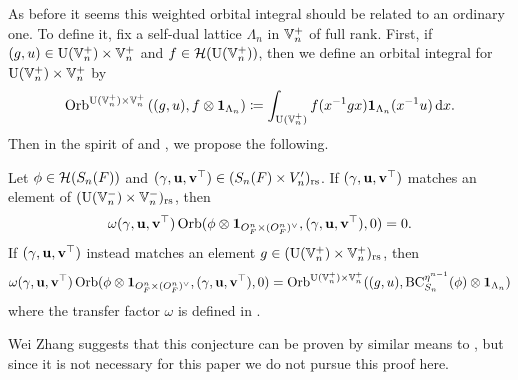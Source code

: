 As before it seems this weighted orbital integral should be related to an ordinary one.
To define it, fix a self-dual lattice $\Lambda_n$ in $\mathbb V_n^+$ of full rank.
First, if $(g,u) \in \operatorname{U}(\mathbb V_n^+) \times \mathbb V_n^+$ and $f \in \mathcal H(\operatorname{U}(\mathbb V_n^+))$,
then we define an orbital integral for $\operatorname{U}(\mathbb V_n^+) \times \mathbb V_n^+$ by
\begin{equation}
  \Orb^{\U(\VV_n^+) \times \VV_n^+}\left( (g,u), f \otimes \mathbf{1}_{\Lambda_n} \right)
  \coloneqq \int_{\U(\VV_n^+)} f(x\inv g x) \mathbf{1}_{\Lambda_n}(x^{-1} u) \odif x.
  \label{eq:unweighted_orbital_semi_lie}
\end{equation}
Then in the spirit of \cite[Conjecture 1.9]{ref:liuFJ}
and , we propose the following.
\begin{conjecture}
  \label{conj:rel_fundamental_lemma_semilie}
  Let $\phi \in \mathcal H(S_n(F))$ and ${(\gamma, \mathbf u, \mathbf v^\top)} \in (S_n(F) \times V_n')_{\mathrm{rs}}$.
  If ${(\gamma, \mathbf u, \mathbf v^\top)}$ matches an element of $(\operatorname{U}(\mathbb V_n^-) \times \mathbb V_n^-)_{\mathrm{rs}}$, then
  \[ \omega{(\gamma, \mathbf u, \mathbf v^\top)} \operatorname{Orb}(\phi \otimes \mathbf{1}_{O_F^n \times (O_F^n)^\vee}, {(\gamma, \mathbf u, \mathbf v^\top)}, 0) = 0. \]
  If ${(\gamma, \mathbf u, \mathbf v^\top)}$ instead matches an element $g \in (\operatorname{U}(\mathbb V_n^+) \times \mathbb V_n^+)_{\mathrm{rs}}$, then
  \[ \omega{(\gamma, \mathbf u, \mathbf v^\top)} \operatorname{Orb}(\phi \otimes \mathbf{1}_{O_F^n \times (O_F^n)^\vee}, {(\gamma, \mathbf u, \mathbf v^\top)}, 0)
    = \operatorname{Orb}^{\operatorname{U}(\mathbb V_n^+) \times \mathbb V_n^+}((g,u), \operatorname{BC}^{\eta^{n-1}}_{S_n}(\phi) \otimes \mathbf{1}_{\Lambda_n}) \]
  where the transfer factor $\omega$ is defined in .
\end{conjecture}
Wei Zhang suggests that this conjecture can be proven by similar means
to ,
but since it is not necessary for this paper we do not pursue this proof here.

